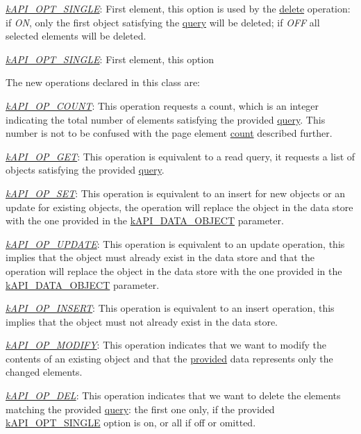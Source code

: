 \begin{DoxyItemize}
\begin{DoxyItemize}
\begin{DoxyItemize}
\item {\itshape \hyperlink{}{k\-A\-P\-I\-\_\-\-O\-P\-T\-\_\-\-S\-I\-N\-G\-L\-E}\/}\-: First element, this option is used by the \hyperlink{}{delete} operation\-: if {\itshape O\-N\/}, only the first object satisfying the \hyperlink{}{query} will be deleted; if {\itshape O\-F\-F\/} all selected elements will be deleted. 
\item {\itshape \hyperlink{}{k\-A\-P\-I\-\_\-\-O\-P\-T\-\_\-\-S\-I\-N\-G\-L\-E}\/}\-: First element, this option 
\end{DoxyItemize}
\end{DoxyItemize}
\end{DoxyItemize}

The new operations declared in this class are\-:


\begin{DoxyItemize}
\item {\itshape \hyperlink{}{k\-A\-P\-I\-\_\-\-O\-P\-\_\-\-C\-O\-U\-N\-T}\/}\-: This operation requests a count, which is an integer indicating the total number of elements satisfying the provided \hyperlink{}{query}. This number is not to be confused with the page element \hyperlink{}{count} described further. 
\item {\itshape \hyperlink{}{k\-A\-P\-I\-\_\-\-O\-P\-\_\-\-G\-E\-T}\/}\-: This operation is equivalent to a read query, it requests a list of objects satisfying the provided \hyperlink{}{query}. 
\item {\itshape \hyperlink{}{k\-A\-P\-I\-\_\-\-O\-P\-\_\-\-S\-E\-T}\/}\-: This operation is equivalent to an insert for new objects or an update for existing objects, the operation will replace the object in the data store with the one provided in the \hyperlink{}{k\-A\-P\-I\-\_\-\-D\-A\-T\-A\-\_\-\-O\-B\-J\-E\-C\-T} parameter. 
\item {\itshape \hyperlink{}{k\-A\-P\-I\-\_\-\-O\-P\-\_\-\-U\-P\-D\-A\-T\-E}\/}\-: This operation is equivalent to an update operation, this implies that the object must already exist in the data store and that the operation will replace the object in the data store with the one provided in the \hyperlink{}{k\-A\-P\-I\-\_\-\-D\-A\-T\-A\-\_\-\-O\-B\-J\-E\-C\-T} parameter. 
\item {\itshape \hyperlink{}{k\-A\-P\-I\-\_\-\-O\-P\-\_\-\-I\-N\-S\-E\-R\-T}\/}\-: This operation is equivalent to an insert operation, this implies that the object must not already exist in the data store. 
\item {\itshape \hyperlink{}{k\-A\-P\-I\-\_\-\-O\-P\-\_\-\-M\-O\-D\-I\-F\-Y}\/}\-: This operation indicates that we want to modify the contents of an existing object and that the \hyperlink{}{provided} data represents only the changed elements. 
\item {\itshape \hyperlink{}{k\-A\-P\-I\-\_\-\-O\-P\-\_\-\-D\-E\-L}\/}\-: This operation indicates that we want to delete the elements matching the provided \hyperlink{}{query}\-: the first one only, if the provided \hyperlink{}{k\-A\-P\-I\-\_\-\-O\-P\-T\-\_\-\-S\-I\-N\-G\-L\-E} option is on, or all if off or omitted. 
\end{DoxyItemize}

